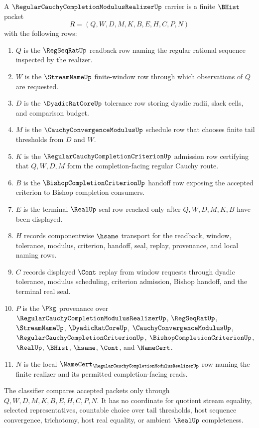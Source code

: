 \begin{definition}
\label{def:regular-cauchy-completion-modulus-realizer-carrier}
A $\RegularCauchyCompletionModulusRealizerUp$ carrier is a finite $\BHist$ packet
$$
R=(Q,W,D,M,K,B,E,H,C,P,N)
$$
with the following rows:
\begin{enumerate}
\item $Q$ is the $\RegSeqRatUp$ readback row naming the regular rational sequence inspected by the realizer.
\item $W$ is the $\StreamNameUp$ finite-window row through which observations of $Q$ are requested.
\item $D$ is the $\DyadicRatCoreUp$ tolerance row storing dyadic radii, slack cells, and comparison budget.
\item $M$ is the $\CauchyConvergenceModulusUp$ schedule row that chooses finite tail thresholds from $D$ and $W$.
\item $K$ is the $\RegularCauchyCompletionCriterionUp$ admission row certifying that $Q,W,D,M$ form the completion-facing regular Cauchy route.
\item $B$ is the $\BishopCompletionCriterionUp$ handoff row exposing the accepted criterion to Bishop completion consumers.
\item $E$ is the terminal $\RealUp$ seal row reached only after $Q,W,D,M,K,B$ have been displayed.
\item $H$ records componentwise $\hsame$ transport for the readback, window, tolerance, modulus, criterion, handoff, seal, replay, provenance, and local naming rows.
\item $C$ records displayed $\Cont$ replay from window requests through dyadic tolerance, modulus scheduling, criterion admission, Bishop handoff, and the terminal real seal.
\item $P$ is the $\Pkg$ provenance over $\RegularCauchyCompletionModulusRealizerUp$, $\RegSeqRatUp$, $\StreamNameUp$, $\DyadicRatCoreUp$, $\CauchyConvergenceModulusUp$, $\RegularCauchyCompletionCriterionUp$, $\BishopCompletionCriterionUp$, $\RealUp$, $\BHist$, $\hsame$, $\Cont$, and $\NameCert$.
\item $N$ is the local $\NameCert_{\RegularCauchyCompletionModulusRealizerUp}$ row naming the finite realizer and its permitted completion-facing reads.
\end{enumerate}
The classifier compares accepted packets only through $Q,W,D,M,K,B,E,H,C,P,N$. It has no coordinate for quotient stream equality, selected representatives, countable choice over tail thresholds, host sequence convergence, trichotomy, host real equality, or ambient $\RealUp$ completeness.
\end{definition}

